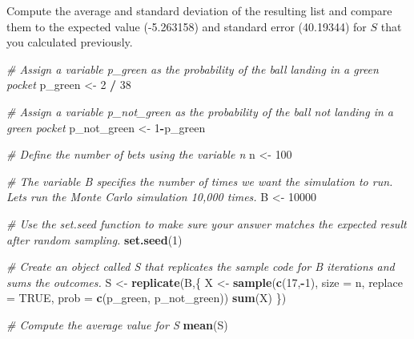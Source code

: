 \documentclass[
]{article}
\newenvironment{Shaded}{\begin{snugshade}}{\end{snugshade}}
\newcommand{\CommentTok}[1]{\textcolor[rgb]{0.56,0.35,0.01}{\textit{#1}}}
\newcommand{\DataTypeTok}[1]{\textcolor[rgb]{0.13,0.29,0.53}{#1}}
\newcommand{\DecValTok}[1]{\textcolor[rgb]{0.00,0.00,0.81}{#1}}
\newcommand{\KeywordTok}[1]{\textcolor[rgb]{0.13,0.29,0.53}{\textbf{#1}}}
\newcommand{\NormalTok}[1]{#1}
\newcommand{\OperatorTok}[1]{\textcolor[rgb]{0.81,0.36,0.00}{\textbf{#1}}}
\newcommand{\OtherTok}[1]{\textcolor[rgb]{0.56,0.35,0.01}{#1}}
\newcommand{\StringTok}[1]{\textcolor[rgb]{0.31,0.60,0.02}{#1}}
\begin{document}
Compute the average and standard deviation of the resulting list and
compare them to the expected value (-5.263158) and standard error
(40.19344) for \(S\) that you calculated previously.

\begin{Shaded}
\begin{Highlighting}[]
\CommentTok{\# Assign a variable \textasciigrave{}p\_green\textasciigrave{} as the probability of the ball landing in a green pocket}
\NormalTok{p\_green \textless{}{-}}\StringTok{ }\DecValTok{2} \OperatorTok{/}\StringTok{ }\DecValTok{38}

\CommentTok{\# Assign a variable \textasciigrave{}p\_not\_green\textasciigrave{} as the probability of the ball not landing in a green pocket}
\NormalTok{p\_not\_green \textless{}{-}}\StringTok{ }\DecValTok{1}\OperatorTok{{-}}\NormalTok{p\_green}

\CommentTok{\# Define the number of bets using the variable \textquotesingle{}n\textquotesingle{}}
\NormalTok{n \textless{}{-}}\StringTok{ }\DecValTok{100}

\CommentTok{\# The variable \textasciigrave{}B\textasciigrave{} specifies the number of times we want the simulation to run. Let\textquotesingle{}s run the Monte Carlo simulation 10,000 times.}
\NormalTok{B \textless{}{-}}\StringTok{ }\DecValTok{10000}

\CommentTok{\# Use the \textasciigrave{}set.seed\textasciigrave{} function to make sure your answer matches the expected result after random sampling.}
\KeywordTok{set.seed}\NormalTok{(}\DecValTok{1}\NormalTok{)}

\CommentTok{\# Create an object called \textasciigrave{}S\textasciigrave{} that replicates the sample code for \textasciigrave{}B\textasciigrave{} iterations and sums the outcomes.}
\NormalTok{S \textless{}{-}}\StringTok{ }\KeywordTok{replicate}\NormalTok{(B,\{}
\NormalTok{   X \textless{}{-}}\StringTok{ }\KeywordTok{sample}\NormalTok{(}\KeywordTok{c}\NormalTok{(}\DecValTok{17}\NormalTok{,}\OperatorTok{{-}}\DecValTok{1}\NormalTok{), }\DataTypeTok{size =}\NormalTok{ n, }\DataTypeTok{replace =} \OtherTok{TRUE}\NormalTok{, }\DataTypeTok{prob =} \KeywordTok{c}\NormalTok{(p\_green, p\_not\_green))}
   \KeywordTok{sum}\NormalTok{(X)}
\NormalTok{   \})}

\CommentTok{\# Compute the average value for \textquotesingle{}S\textquotesingle{}}
\KeywordTok{mean}\NormalTok{(S)}
\end{Highlighting}
\end{Shaded}
\end{document}
